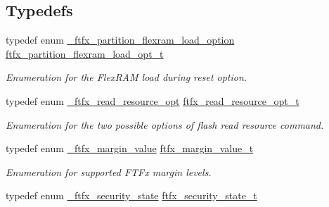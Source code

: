 \subsection*{Typedefs}
\begin{DoxyCompactItemize}
\item 
\mbox{\label{group__ftfx__controller_ga78043d7b5753a2e4f6f61fe8bbae68d0}} 
typedef enum \mbox{\hyperlink{group__ftfx__controller_ga59fd3ff5f66c9a21c80a48a95a085648}{\+\_\+ftfx\+\_\+partition\+\_\+flexram\+\_\+load\+\_\+option}} \mbox{\hyperlink{group__ftfx__controller_ga78043d7b5753a2e4f6f61fe8bbae68d0}{ftfx\+\_\+partition\+\_\+flexram\+\_\+load\+\_\+opt\+\_\+t}}
\begin{DoxyCompactList}\small\item\em Enumeration for the Flex\+R\+AM load during reset option. \end{DoxyCompactList}\item 
\mbox{\label{group__ftfx__controller_ga96edaa38d804ca4f1af33352d7ee67be}} 
typedef enum \mbox{\hyperlink{group__ftfx__controller_gad6557da8fe12a2fd572ace03395c3fd8}{\+\_\+ftfx\+\_\+read\+\_\+resource\+\_\+opt}} \mbox{\hyperlink{group__ftfx__controller_ga96edaa38d804ca4f1af33352d7ee67be}{ftfx\+\_\+read\+\_\+resource\+\_\+opt\+\_\+t}}
\begin{DoxyCompactList}\small\item\em Enumeration for the two possible options of flash read resource command. \end{DoxyCompactList}\item 
\mbox{\label{group__ftfx__controller_ga2cef5154a854c303445b4bd5139f6392}} 
typedef enum \mbox{\hyperlink{group__ftfx__controller_gaddebf946b93b4027ecf283eb93f08b12}{\+\_\+ftfx\+\_\+margin\+\_\+value}} \mbox{\hyperlink{group__ftfx__controller_ga2cef5154a854c303445b4bd5139f6392}{ftfx\+\_\+margin\+\_\+value\+\_\+t}}
\begin{DoxyCompactList}\small\item\em Enumeration for supported F\+T\+Fx margin levels. \end{DoxyCompactList}\item 
\mbox{\label{group__ftfx__controller_gae49df85d158f3651e17d1bb660a4f1c2}} 
typedef enum \mbox{\hyperlink{group__ftfx__controller_ga0b42dbcfacb9ac0da48c674dd6a35f2f}{\+\_\+ftfx\+\_\+security\+\_\+state}} \mbox{\hyperlink{group__ftfx__controller_gae49df85d158f3651e17d1bb660a4f1c2}{ftfx\+\_\+security\+\_\+state\+\_\+t}}

\end{DoxyCompactItemize}
